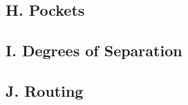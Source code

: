 \subsection{H. Pockets}
\raggedbottom
\hrulefill
\subsection{I. Degrees of Separation}
\raggedbottom
\hrulefill
\subsection{J. Routing}
\raggedbottom
\hrulefill

